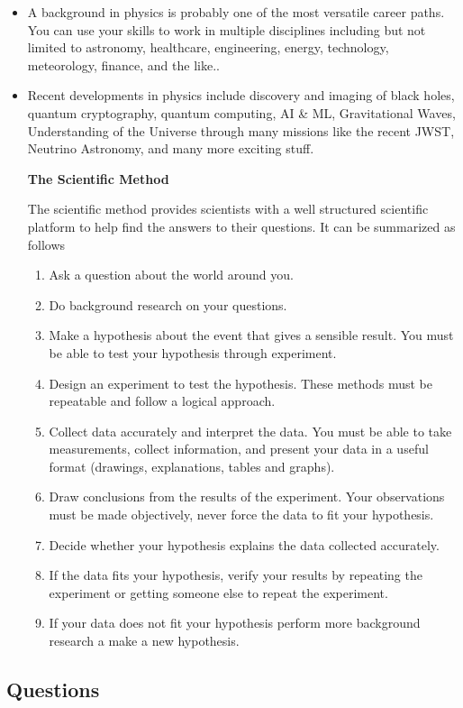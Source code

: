 \documentclass[12pt,addpoints]{exam}
\begin{document}
\begin{itemize}
		\item A background in physics is probably one of the most versatile career paths. You can use your skills to work in multiple disciplines including but not limited to  astronomy, healthcare, engineering, energy, technology, meteorology, finance, and the like..
		\item Recent developments in physics include discovery and imaging of black holes, quantum cryptography, quantum computing, AI \& ML, Gravitational Waves, Understanding of the Universe through many missions like the recent JWST, Neutrino Astronomy, and many more exciting stuff. 
		\begin{center}
			\textbf{The Scientific Method} 	
		\end{center}
		The scientific method provides scientists with a well structured
		scientific platform to help find the answers to their questions. It can be summarized as follows \begin{enumerate}
			\item Ask a question about the world around you.
			\item Do background research on your questions.
			\item Make a hypothesis about the event that gives a sensible result. You must be able to test your hypothesis through experiment.
			\item Design an experiment to test the hypothesis. These methods must be repeatable
			and follow a logical approach.
			\item Collect data accurately and interpret the data. You must be able to take measurements, collect information, and present your data in a useful format (drawings,
			explanations, tables and graphs).
			\item Draw conclusions from the results of the experiment. Your observations must be made objectively, never force the data to fit your hypothesis.
			\item Decide whether your hypothesis explains the data collected accurately.
			\item If the data fits your hypothesis, verify your results by repeating the experiment or getting someone else to repeat the experiment.
			\item If your data does not fit your hypothesis perform more background research a make a new hypothesis.
		\end{enumerate}
	\end{itemize}
	\begin{center}
		\subsection*{Questions}	
	\end{center}
\end{document}
